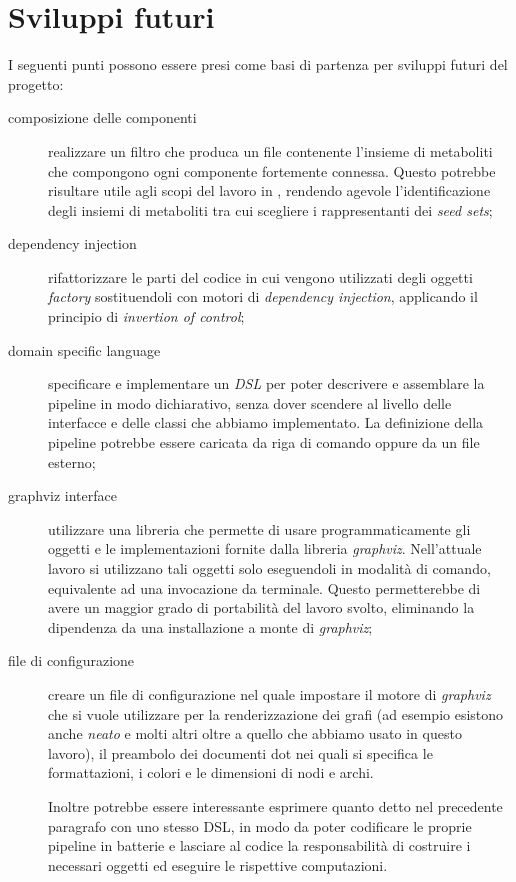 \section{Sviluppi futuri}

I seguenti punti possono essere presi come basi di partenza per
sviluppi futuri del progetto:
\begin{description}
\item[composizione delle componenti] realizzare un filtro che produca
  un file contenente l'insieme di metaboliti che compongono ogni
  componente fortemente connessa. Questo potrebbe risultare utile agli
  scopi del lavoro in \cite{large-scale-reconstruction}, rendendo
  agevole l'identificazione degli insiemi di metaboliti tra cui
  scegliere i rappresentanti dei \emph{seed sets};
\item[dependency injection] rifattorizzare le parti del codice in cui
  vengono utilizzati degli oggetti \emph{factory} sostituendoli con
  motori di \emph{dependency injection}, applicando il principio di
  \emph{invertion of control};
\item[domain specific language] specificare e implementare un
  \emph{DSL} per poter descrivere e assemblare la pipeline in modo
  dichiarativo, senza dover scendere al livello delle interfacce e
  delle classi che abbiamo implementato. La definizione della pipeline
  potrebbe essere caricata da riga di comando oppure da un file
  esterno;
\item[graphviz interface] utilizzare una libreria che permette di
  usare programmaticamente gli oggetti e le implementazioni fornite
  dalla libreria \emph{graphviz}. Nell'attuale lavoro si utilizzano
  tali oggetti solo eseguendoli in modalit\`a di comando, equivalente
  ad una invocazione da terminale. Questo permetterebbe di avere un
  maggior grado di portabilit\`a del lavoro svolto, eliminando la
  dipendenza da una installazione a monte di \emph{graphviz};
\item[file di configurazione] creare un file di configurazione nel
  quale impostare il motore di \emph{graphviz} che si vuole utilizzare
  per la renderizzazione dei grafi (ad esempio esistono anche
  \emph{neato} e molti altri oltre a quello che abbiamo usato in
  questo lavoro), il preambolo dei documenti dot nei quali si
  specifica le formattazioni, i colori e le dimensioni di nodi e
  archi.

  Inoltre potrebbe essere interessante esprimere quanto detto nel
  precedente paragrafo con uno stesso DSL, in modo da poter codificare
  le proprie pipeline in batterie e lasciare al codice la
  responsabilit\`a di costruire i necessari oggetti ed eseguire le
  rispettive computazioni.


\end{description}
